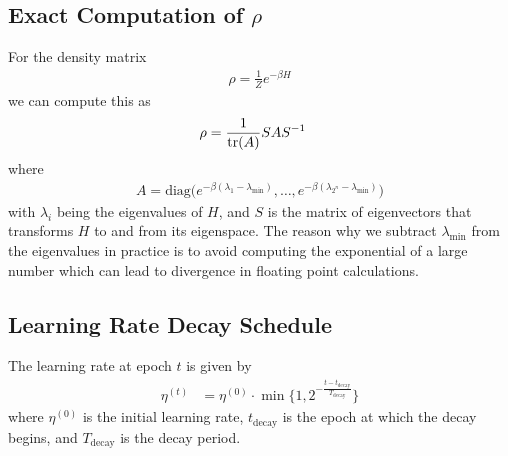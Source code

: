 \subsection{Exact Computation of \( \rho \)}\label{app:exact_rho_computation}
For the density matrix
\begin{align}
    \rho = \frac{1}{Z} e^{-\beta H}
\end{align}
we can compute this as
\begin{align}
    \rho
        &= \frac{1}{\text{tr}(A)} S A S^{-1}
\end{align}
where
\begin{align}
    A = \text{diag}\Big(e^{-\beta(\lambda_1 - \lambda_{\min})}, \dots, e^{-\beta(\lambda_{2^n} - \lambda_{\min})}\Big)
\end{align}
with \( \lambda_i \) being the eigenvalues of \( H \), and \( S \) is the matrix of eigenvectors that transforms \( H \) to and from its eigenspace.
The reason why we subtract \( \lambda_{\min} \) from the eigenvalues in practice is to avoid computing the exponential of a large number which can lead to divergence in floating point calculations.

\subsection{Learning Rate Decay Schedule}\label{app:lr_exp_decay}
The learning rate at epoch \( t \) is given by
\begin{align}
    \eta^{(t)}
        &= \eta^{(0)} \cdot \min\bigg\{1, 2^{-\frac{t - t_\text{decay}}{T_\text{decay}}}\bigg\}
\end{align}
where \( \eta^{(0)} \) is the initial learning rate, \( t_\text{decay} \) is the epoch at which the decay begins, and \( T_\text{decay} \) is the decay period.
